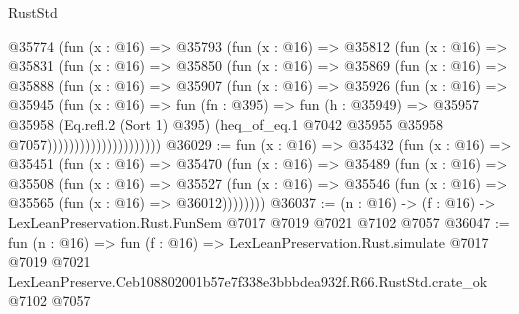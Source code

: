 \begin{lexlean}{RustStd}
\begin{coremodule}
                      @35774
                        (fun (x : @16) =>
                        @35793
                          (fun (x : @16) =>
                          @35812
                            (fun (x : @16) =>
                            @35831
                              (fun (x : @16) =>
                              @35850
                                (fun (x : @16) =>
                                @35869
                                  (fun (x : @16) =>
                                  @35888
                                    (fun (x : @16) =>
                                    @35907
                                      (fun (x : @16) =>
                                      @35926
                                        (fun (x : @16) =>
                                        @35945
                                          (fun (x : @16) =>
                                          fun (fn : @395) =>
                                          fun (h : @35949) =>
                                          @35957
                                            @35958
                                            (Eq.refl.{2} (Sort 1) @395)
                                            (heq_of_eq.{1}
                                              @7042
                                              @35955
                                              @35958
                                              @7057)))))))))))))))))))))
@36029 := fun (x : @16) =>
  @35432
    (fun (x : @16) =>
    @35451
      (fun (x : @16) =>
      @35470
        (fun (x : @16) =>
        @35489
          (fun (x : @16) =>
          @35508
            (fun (x : @16) =>
            @35527
              (fun (x : @16) => @35546 (fun (x : @16) => @35565 (fun (x : @16) => @36012))))))))
@36037 := (n : @16) -> (f : @16) -> LexLeanPreservation.Rust.FunSem @7017 @7019 @7021 @7102 @7057
@36047 := fun (n : @16) =>
  fun (f : @16) =>
  LexLeanPreservation.Rust.simulate
    @7017
    @7019
    @7021
    LexLeanPreserve.Ceb108802001b57e7f338e3bbbdea932f.R66.RustStd.crate_ok
    @7102
    @7057
\end{coremodule}
\end{lexlean}
